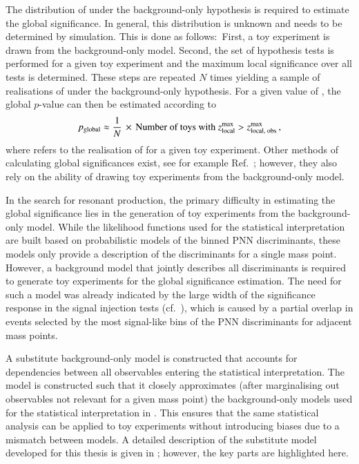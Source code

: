 The distribution of \Zmaxlocal under the background-only hypothesis is required
to estimate the global significance. In general, this distribution is unknown
and needs to be determined by simulation. This is done as follows:~First, a toy
experiment is drawn from the background-only model. Second, the set of
hypothesis tests is performed for a given toy experiment and the maximum local
significance over all tests is determined. These steps are repeated $N$ times
yielding a sample of realisations of \Zmaxlocal under the background-only
hypothesis. For a given value of \zmaxlocalobs, the global $p$-value can then be
estimated according to
\begin{align*}
  p_{\text{global}} \approx \frac{1}{N} \,\times\, \text{Number of toys with } z_{\text{local}}^{\text{max}} > z_{\text{local, obs}}^{\text{max}} \,\text{,}
\end{align*}
where \zmaxlocal refers to the realisation of \Zmaxlocal for a given toy
experiment. Other methods of calculating global significances exist, see for
example Ref.~\cite{Gross:2010qma}; however, they also rely on the ability of
drawing toy experiments from the background-only model.

In the search for resonant \HH production, the primary difficulty in estimating
the global significance lies in the generation of toy experiments from the
background-only model. While the likelihood functions used for the statistical
interpretation are built based on probabilistic models of the binned PNN
discriminants, these models only provide a description of the discriminants for
a single mass point. However, a background model that jointly describes all
discriminants is required to generate toy experiments for the global
significance estimation. The need for such a model was already indicated by the
large width of the significance response in the signal injection tests
(cf.~), which is caused by a partial overlap in
events selected by the most signal-like bins of the PNN discriminants for
adjacent mass points.

A substitute background-only model is constructed that accounts for dependencies
between all observables entering the statistical interpretation. The model is
constructed such that it closely approximates (after marginalising out
observables not relevant for a given mass point) the background-only models used
for the statistical interpretation in . This ensures that
the same statistical analysis can be applied to toy experiments without
introducing biases due to a mismatch between models. A detailed description of
the substitute model developed for this thesis is given in
; however, the key parts are highlighted here.

